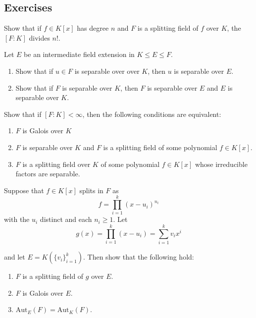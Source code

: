 \subsection{Exercises}

\begin{problem}[Hungerford 5.3.5]
Show that if $f\in K[x]$ has degree $n$ and $F$ is a splitting field of $f$ over $K$, the $[F: K]$ divides $n!$.
\end{problem}

\begin{problem}[Hungerford 5.3.12]
Let $E$ be an intermediate field extension in $K \leq E \leq F$.
\begin{enumerate}
    \item Show that if $u\in F$ is separable over over $K$, then $u$ is separable over $E$.
    \item Show that if $F$ is separable over $K$, then $F$ is separable over $E$ and $E$ is separable over $K$.
\end{enumerate}
\end{problem}

\begin{problem}[Hungerford 5.3.13]
Show that if $[F: K] < \infty$, then the following conditions are equivalent:
\begin{enumerate}
    \item $F$ is Galois over $K$
    \item $F$ is separable over $K$ and $F$ is a splitting field of some polynomial $f\in K[x]$.
    \item $F$ is a splitting field over $K$ of some polynomial $f\in K[x]$ whose irreducible factors are separable.
\end{enumerate}
\end{problem}

\begin{problem}[Hungerford 5.4.1]
Suppose that $f\in K[x]$ splits in $F$ as
$$
f = \prod_{i=1}^k (x-u_i)^{n_i}
$$
with the $u_i$ distinct and each $n_i \geq 1$. Let 
$$
g(x) = \prod_{i=1}^k (x-u_i) = \sum_{i=1}^k v_i x^i
$$

and let $E  = K(\{v_i\}_{i=1}^k)$. Then show that the following hold:
\begin{enumerate}
    \item $F$ is a splitting field of $g$ over $E$.
    \item $F$ is Galois over $E$.
    \item $\mathrm{Aut}_E(F) = \mathrm{Aut}_K(F)$.
\end{enumerate}
\end{problem}

